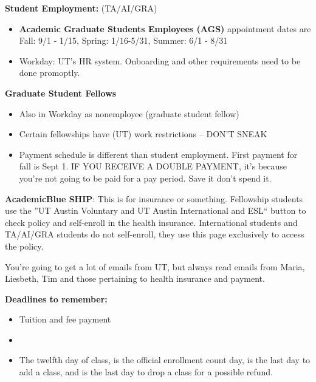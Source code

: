 \textbf{Student Employment:} (TA/AI/GRA)
\begin{itemize}
	\item \textbf{Academic Graduate Students Employees (AGS)} appointment dates are Fall: 9/1 - 1/15, Spring: 1/16-5/31, Summer: 6/1 - 8/31
	\item Workday: UT's HR system. Onboarding and other requirements need to be done promoptly.
\end{itemize}

\bigskip

\textbf{Graduate Student Fellows}
\begin{itemize}
	\item Also in Workday as nonemployee (graduate student fellow)
	\item Certain fellowships have (UT) work restrictions -- DON'T SNEAK
	\item Payment schedule is different than student employment. First payment for fall is Sept 1. IF YOU RECEIVE A DOUBLE PAYMENT, it's because you're not going to be paid for a pay period. Save it don't spend it.
\end{itemize}

\bigskip

\textbf{AcademicBlue SHIP}: This is for insurance or something. Fellowship students use the ''UT Austin Voluntary and UT Austin International and ESL`` button to check policy and self-enroll in the health insurance. International students and TA/AI/GRA students do not self-enroll, they use this page exclusively to access the policy.

\bigskip

You're going to get a lot of emails from UT, but always read emails from Maria, Liesbeth, Tim and those pertaining to health insurance and payment.

\bigskip

\textbf{Deadlines to remember:}
\begin{itemize}
	\item Tuition and fee payment 
	\item {}
	\item The twelfth day of class,  is the official enrollment count day, is the last day to add a class, and is the last day to drop a class for a possible refund.
\end{itemize}

